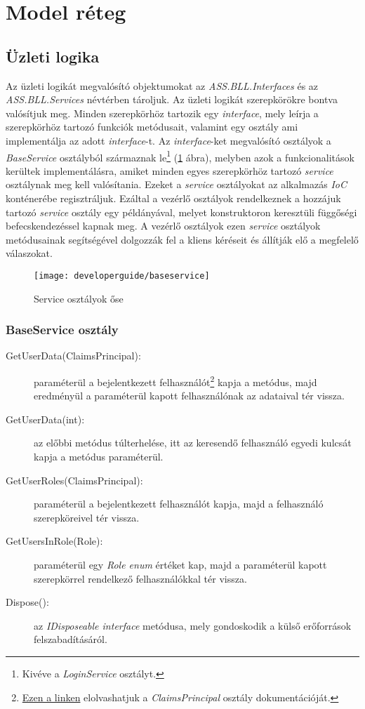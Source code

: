 \section{Model réteg}
\label{sec:model}
\subsection{Üzleti logika}
Az üzleti logikát megvalósító objektumokat az \emph{ASS.BLL.Interfaces} és az \emph{ASS.BLL.Services} névtérben tároljuk. Az üzleti logikát szerepkörökre bontva valósítjuk meg. Minden szerepkörhöz tartozik egy \emph{interface}, mely leírja a szerepkörhöz tartozó funkciók metódusait, valamint egy osztály ami implementálja az adott \emph{interface}-t. Az \emph{interface}-ket megvalósító osztályok a \emph{BaseService} osztályból származnak le\footnote{Kivéve a \emph{LoginService} osztályt.} (\ref{fig:bll-baseservice} ábra), melyben azok a funkcionalitások kerültek implementálásra, amiket minden egyes szerepkörhöz tartozó \emph{service} osztálynak meg kell valósítania. Ezeket a \emph{service} osztályokat az alkalmazás \emph{IoC} konténerébe \cite{IoC} regisztráljuk. Ezáltal a vezérlő osztályok rendelkeznek a hozzájuk tartozó \emph{service} osztály egy példányával, melyet konstruktoron keresztüli függőségi befecskendezéssel kapnak meg. A vezérlő osztályok ezen \emph{service} osztályok metódusainak segítségével dolgozzák fel a kliens kéréseit és állítják elő a megfelelő válaszokat.
\begin{figure}[H]
	\centering
	\texttt{[image: developerguide/baseservice]}
	\caption{Service osztályok őse}
	\label{fig:bll-baseservice}
\end{figure}
\subsubsection{BaseService osztály}
\begin{description}
	\item[GetUserData(ClaimsPrincipal):] paraméterül a bejelentkezett felhasználót\footnote{\href{https://docs.microsoft.com/en-us/dotnet/api/system.security.claims.claimsprincipal?view=netcore-3.1}{Ezen a linken} elolvashatjuk a \emph{ClaimsPrincipal} osztály dokumentációját.} kapja a metódus, majd eredményül a paraméterül kapott felhasználónak az adataival tér vissza.
	\item[GetUserData(int):] az előbbi metódus túlterhelése, itt az keresendő felhasználó egyedi kulcsát kapja a metódus paraméterül.
	\item[GetUserRoles(ClaimsPrincipal):] paraméterül a bejelentkezett felhasználót kapja, majd a felhasználó szerepköreivel tér vissza.
	\item[GetUsersInRole(Role):] paraméterül egy \emph{Role enum} értéket kap, majd a paraméterül kapott szerepkörrel rendelkező felhasználókkal tér vissza.
	\item[Dispose():] az \emph{IDisposeable interface} metódusa, mely gondoskodik a külső erőforrások felszabadításáról.
\end{description}
